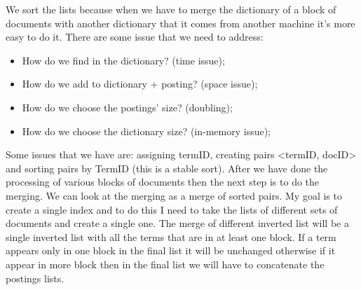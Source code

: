 We sort the lists because when we have to merge the dictionary of a block of documents with another dictionary that it comes from another machine it's more easy to do it.\newline
There are some issue that we need to address:
\begin{itemize}
    \item How do we find in the dictionary? (time issue);
    \item How do we add to dictionary + posting? (space issue);
    \item How do we choose the postings' size? (doubling);
    \item How do we choose the dictionary size? (in-memory issue);
\end{itemize}
Some issues that we have are: assigning termID, creating pairs <termID, docID> and sorting pairs by TermID (this is a stable sort).\newline
After we have done the processing of various blocks of documents then the next step is to do the merging. We can look at the merging as a merge of sorted pairs.\newline
My goal is to create a single index and to do this I need to take the lists of different sets of documents and create a single one. The merge of different inverted list will be a single inverted list with all the terms that are in at least one block. If a term appears only in one block in the final list it will be unchanged otherwise if it appear in more block then in the final list we will have to concatenate the postings lists.\newline
